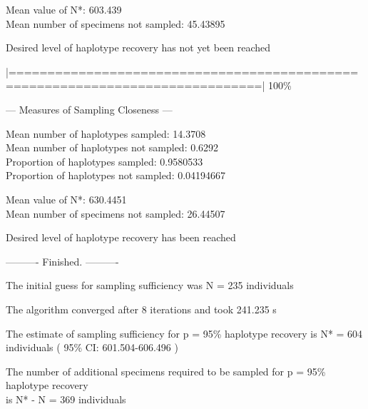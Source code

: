 {\vspace{2mm} 
 
\noindent Mean value of N*: 603.439 \\
Mean number of specimens not sampled: 45.43895

\vspace{3mm}
 
\noindent Desired level of haplotype recovery has not yet been reached

\vspace{2mm}

\noindent |==============================================================================| 100\%

\vspace{3mm}

\noindent --- Measures of Sampling Closeness ---

\vspace{2mm} 
 
\noindent Mean number of haplotypes sampled: 14.3708  \\
Mean number of haplotypes not sampled: 0.6292  \\
Proportion of haplotypes sampled:  0.9580533  \\
Proportion of haplotypes not sampled: 0.04194667    

\vspace{2mm} 
 
\noindent Mean value of N*: 630.4451  \\
Mean number of specimens not sampled: 26.44507

\vspace{3mm}
 
\noindent Desired level of haplotype recovery has been reached

\vspace{2mm}

\noindent ---------- Finished. ----------
        
\noindent The initial guess for sampling sufficiency was N = 235 individuals
 
\noindent The algorithm converged after 8 iterations and took 241.235 s 
 
\noindent The estimate of sampling sufficiency for p = 95\% haplotype recovery is N* = 604 \\ individuals ( 95\% CI: 601.504-606.496 )

\noindent The number of additional specimens required to be sampled for p = 95\% haplotype recovery \\ is N* - N = 369 individuals}

